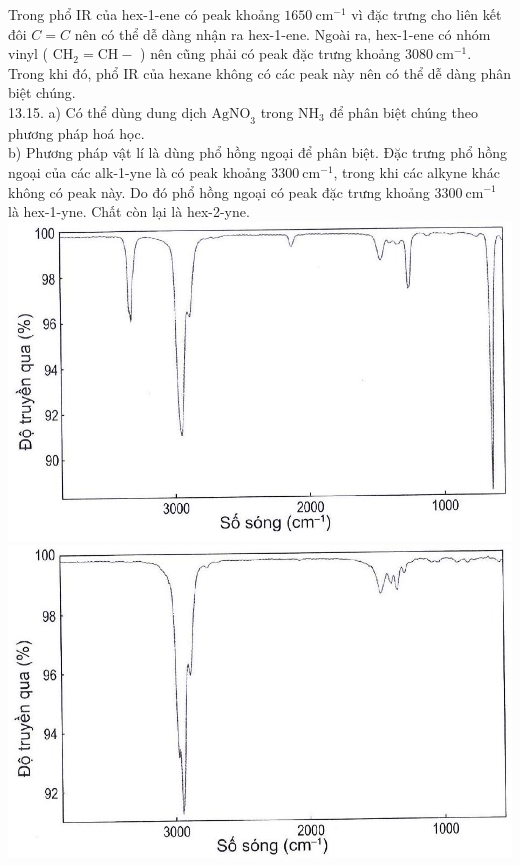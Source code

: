 \documentclass[10pt]{article}
\begin{document}
Trong phổ IR của hex-1-ene có peak khoảng $1650 \mathrm{~cm}^{-1}$ vì đặc trưng cho liên kết đôi $C=C$ nên có thể dễ dàng nhận ra hex-1-ene. Ngoài ra, hex-1-ene có nhóm vinyl ( $\mathrm{CH}_{2}=\mathrm{CH}-$ ) nên cũng phải có peak đặc trưng khoảng $3080 \mathrm{~cm}^{-1}$. Trong khi đó, phổ IR của hexane không có các peak này nên có thể dễ dàng phân biệt chúng.\\
13.15. a) Có thể dùng dung dịch $\mathrm{AgNO}_{3}$ trong $\mathrm{NH}_{3}$ để phân biệt chúng theo phương pháp hoá học.\\
b) Phương pháp vật lí là dùng phổ hồng ngoại để phân biệt. Đặc trưng phổ hồng ngoại của các alk-1-yne là có peak khoảng $3300 \mathrm{~cm}^{-1}$, trong khi các alkyne khác không có peak này. Do đó phổ hồng ngoại có peak đặc trưng khoảng $3300 \mathrm{~cm}^{-1}$ là hex-1-yne. Chất còn lại là hex-2-yne.\\
\includegraphics[max width=\textwidth, center]{2025_10_23_adad5b98d65ac6665838g-23(1)}\\
\includegraphics[max width=\textwidth, center]{2025_10_23_adad5b98d65ac6665838g-23}\\
\end{document}
